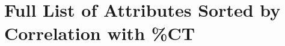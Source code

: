 \chapter{Full List of Attributes Sorted by Correlation with \%CT}
\label{app:sorted-attributes-list}

